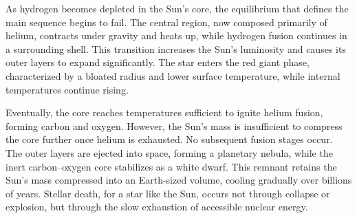 As hydrogen becomes depleted in the Sun’s core, the equilibrium that defines the main sequence begins to fail. The central region, now composed primarily of helium, contracts under gravity and heats up, while hydrogen fusion continues in a surrounding shell. This transition increases the Sun’s luminosity and causes its outer layers to expand significantly. The star enters the red giant phase, characterized by a bloated radius and lower surface temperature, while internal temperatures continue rising.

Eventually, the core reaches temperatures sufficient to ignite helium fusion, forming carbon and oxygen. However, the Sun’s mass is insufficient to compress the core further once helium is exhausted. No subsequent fusion stages occur. The outer layers are ejected into space, forming a planetary nebula, while the inert carbon–oxygen core stabilizes as a white dwarf. This remnant retains the Sun’s mass compressed into an Earth-sized volume, cooling gradually over billions of years. Stellar death, for a star like the Sun, occurs not through collapse or explosion, but through the slow exhaustion of accessible nuclear energy.


\thispagestyle{empty}
\begin{figure}[p]
\centering
{}
\end{figure}